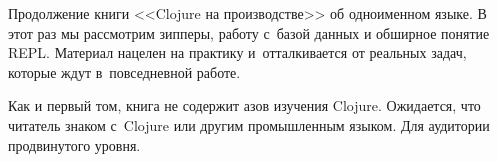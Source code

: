 \thispagestyle{empty}

Продолжение книги <<Clojure на производстве>> об одноименном языке. В этот раз
мы рассмотрим зипперы, работу с~базой данных и обширное понятие REPL. Материал
нацелен на практику и~отталкивается от реальных задач, которые ждут
в~повседневной работе.

Как и первый том, книга не содержит азов изучения Clojure. Ожидается, что
читатель знаком с~Clojure или другим промышленным языком. Для аудитории
продвинутого уровня.
